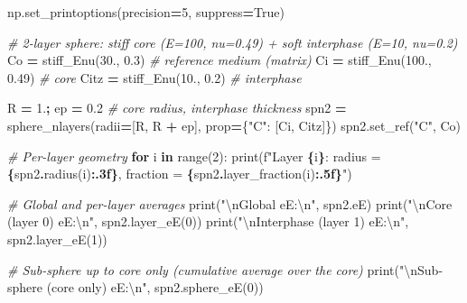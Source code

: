 \documentclass[
  a4paper,
  numbers=noendperiod,
  DIV=12]{scrreprt}
\newenvironment{Shaded}{\begin{snugshade}}{\end{snugshade}}
\newcommand{\BuiltInTok}[1]{#1}
\newcommand{\CharTok}[1]{\textcolor[rgb]{0.31,0.60,0.02}{#1}}
\newcommand{\CommentTok}[1]{\textcolor[rgb]{0.56,0.35,0.01}{\textit{#1}}}
\newcommand{\ControlFlowTok}[1]{\textcolor[rgb]{0.13,0.29,0.53}{\textbf{#1}}}
\newcommand{\DecValTok}[1]{\textcolor[rgb]{0.00,0.00,0.81}{#1}}
\newcommand{\FloatTok}[1]{\textcolor[rgb]{0.00,0.00,0.81}{#1}}
\newcommand{\KeywordTok}[1]{\textcolor[rgb]{0.13,0.29,0.53}{\textbf{#1}}}
\newcommand{\NormalTok}[1]{#1}
\newcommand{\OperatorTok}[1]{\textcolor[rgb]{0.81,0.36,0.00}{\textbf{#1}}}
\newcommand{\SpecialCharTok}[1]{\textcolor[rgb]{0.81,0.36,0.00}{\textbf{#1}}}
\newcommand{\SpecialStringTok}[1]{\textcolor[rgb]{0.31,0.60,0.02}{#1}}
\newcommand{\StringTok}[1]{\textcolor[rgb]{0.31,0.60,0.02}{#1}}
\newcommand{\VariableTok}[1]{\textcolor[rgb]{0.00,0.00,0.00}{#1}}
\begin{document}
\begin{Shaded}
\begin{Highlighting}[]
\NormalTok{np.set\_printoptions(precision}\OperatorTok{=}\DecValTok{5}\NormalTok{, suppress}\OperatorTok{=}\VariableTok{True}\NormalTok{)}

\CommentTok{\# 2{-}layer sphere: stiff core (E=100, nu=0.49) + soft interphase (E=10, nu=0.2)}
\NormalTok{Co   }\OperatorTok{=}\NormalTok{ stiff\_Enu(}\FloatTok{30.}\NormalTok{,  }\FloatTok{0.3}\NormalTok{)   }\CommentTok{\# reference medium (matrix)}
\NormalTok{Ci   }\OperatorTok{=}\NormalTok{ stiff\_Enu(}\FloatTok{100.}\NormalTok{, }\FloatTok{0.49}\NormalTok{)  }\CommentTok{\# core}
\NormalTok{Citz }\OperatorTok{=}\NormalTok{ stiff\_Enu(}\FloatTok{10.}\NormalTok{,  }\FloatTok{0.2}\NormalTok{)   }\CommentTok{\# interphase}

\NormalTok{R }\OperatorTok{=} \FloatTok{1.}\OperatorTok{;}\NormalTok{ ep }\OperatorTok{=} \FloatTok{0.2}              \CommentTok{\# core radius, interphase thickness}
\NormalTok{spn2 }\OperatorTok{=}\NormalTok{ sphere\_nlayers(radii}\OperatorTok{=}\NormalTok{[R, R }\OperatorTok{+}\NormalTok{ ep], prop}\OperatorTok{=}\NormalTok{\{}\StringTok{"C"}\NormalTok{: [Ci, Citz]\})}
\NormalTok{spn2.set\_ref(}\StringTok{"C"}\NormalTok{, Co)}

\CommentTok{\# Per{-}layer geometry}
\ControlFlowTok{for}\NormalTok{ i }\KeywordTok{in} \BuiltInTok{range}\NormalTok{(}\DecValTok{2}\NormalTok{):}
    \BuiltInTok{print}\NormalTok{(}\SpecialStringTok{f"Layer }\SpecialCharTok{\{}\NormalTok{i}\SpecialCharTok{\}}\SpecialStringTok{:  radius = }\SpecialCharTok{\{}\NormalTok{spn2}\SpecialCharTok{.}\NormalTok{radius(i)}\SpecialCharTok{:.3f\}}\SpecialStringTok{,  fraction = }\SpecialCharTok{\{}\NormalTok{spn2}\SpecialCharTok{.}\NormalTok{layer\_fraction(i)}\SpecialCharTok{:.5f\}}\SpecialStringTok{"}\NormalTok{)}

\CommentTok{\# Global and per{-}layer averages}
\BuiltInTok{print}\NormalTok{(}\StringTok{"}\CharTok{\textbackslash{}n}\StringTok{Global eE:}\CharTok{\textbackslash{}n}\StringTok{"}\NormalTok{, spn2.eE)}
\BuiltInTok{print}\NormalTok{(}\StringTok{"}\CharTok{\textbackslash{}n}\StringTok{Core (layer 0) eE:}\CharTok{\textbackslash{}n}\StringTok{"}\NormalTok{, spn2.layer\_eE(}\DecValTok{0}\NormalTok{))}
\BuiltInTok{print}\NormalTok{(}\StringTok{"}\CharTok{\textbackslash{}n}\StringTok{Interphase (layer 1) eE:}\CharTok{\textbackslash{}n}\StringTok{"}\NormalTok{, spn2.layer\_eE(}\DecValTok{1}\NormalTok{))}

\CommentTok{\# Sub{-}sphere up to core only (cumulative average over the core)}
\BuiltInTok{print}\NormalTok{(}\StringTok{"}\CharTok{\textbackslash{}n}\StringTok{Sub{-}sphere (core only) eE:}\CharTok{\textbackslash{}n}\StringTok{"}\NormalTok{, spn2.sphere\_eE(}\DecValTok{0}\NormalTok{))}


\end{Highlighting}
\end{Shaded}
\end{document}
